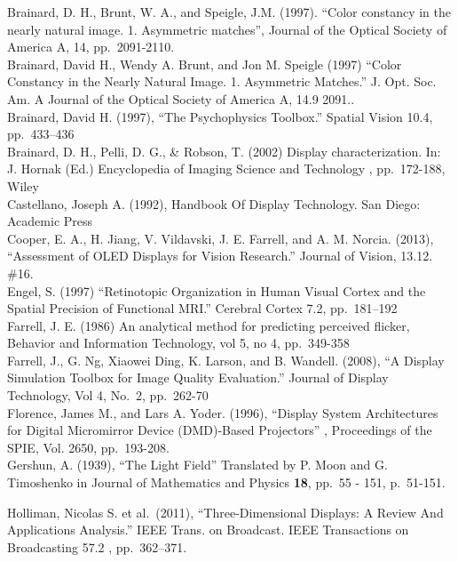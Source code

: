 \documentclass[
  letterpaper,
]{book}
\begin{document}
Brainard, D. H., Brunt, W. A., and Speigle, J.M. (1997). ``Color
constancy in the nearly natural image. 1. Asymmetric matches'', Journal
of the Optical Society of America A, 14, pp.~2091-2110.\\
Brainard, David H., Wendy A. Brunt, and Jon M. Speigle (1997) ``Color
Constancy in the Nearly Natural Image. 1. Asymmetric Matches.'' J. Opt.
Soc. Am. A Journal of the Optical Society of America A, 14.9 2091..\\
Brainard, David H. (1997), ``The Psychophysics Toolbox.'' Spatial Vision
10.4, pp.~433--436\\
Brainard, D. H., Pelli, D. G., \& Robson, T. (2002) Display
characterization. In: J. Hornak (Ed.) Encyclopedia of Imaging Science
and Technology , pp.~172-188, Wiley\\
Castellano, Joseph A. (1992), Handbook Of Display Technology. San Diego:
Academic Press\\
Cooper, E. A., H. Jiang, V. Vildavski, J. E. Farrell, and A. M. Norcia.
(2013), ``Assessment of OLED Displays for Vision Research.'' Journal of
Vision, 13.12. \#16.\\
Engel, S. (1997) ``Retinotopic Organization in Human Visual Cortex and
the Spatial Precision of Functional MRI.'' Cerebral Cortex 7.2,
pp.~181--192\\
Farrell, J. E. (1986) An analytical method for predicting perceived
flicker, Behavior and Information Technology, vol 5, no 4, pp.~349-358\\
Farrell, J., G. Ng, Xiaowei Ding, K. Larson, and B. Wandell. (2008), ``A
Display Simulation Toolbox for Image Quality Evaluation.'' Journal of
Display Technology, Vol 4, No.~2, pp.~262-70\\
Florence, James M., and Lars A. Yoder. (1996), ``Display System
Architectures for Digital Micromirror Device (DMD)-Based Projectors'' ,
Proceedings of the SPIE, Vol. 2650, pp.~193-208.\\
Gershun, A. (1939), ``The Light Field'' Translated by P. Moon and G.
Timoshenko in Journal of Mathematics and Physics \textbf{18}, pp.~55 -
151, p.~51-151.

Holliman, Nicolas S. et al.~(2011), ``Three-Dimensional Displays: A
Review And Applications Analysis.'' IEEE Trans. on Broadcast. IEEE
Transactions on Broadcasting 57.2 , pp.~362--371.
\end{document}

